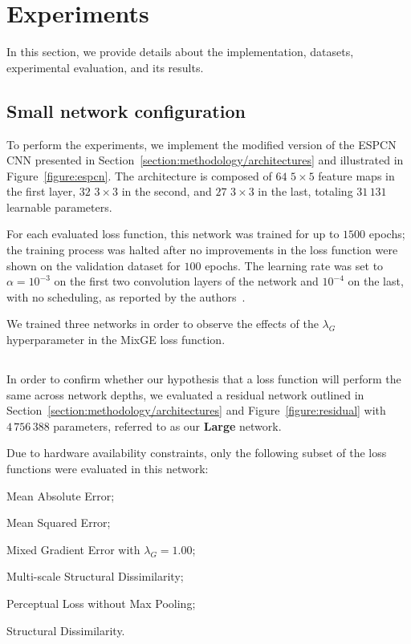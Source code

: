 \section{Experiments}



In this section, we provide details about the implementation, datasets, experimental evaluation, and its results.

\subsection{Small network configuration}

To perform the experiments, we implement the modified version of the ESPCN CNN presented in Section~\ref{section:methodology/architectures} and illustrated in Figure~\ref{figure:espcn}. The architecture is composed of {$64$ $5\times 5$} feature maps in the first layer, {$32$ $3\times 3$} in the second, and $27$ $3\times 3$ in the last, totaling $31\,131$ learnable parameters.

For each evaluated loss function, this network was trained for up to $1500$ epochs; the training process was halted after no improvements in the loss function were shown on the validation dataset for $100$ epochs. The learning rate was set to ${\alpha = 10^{-3}}$ on the first two convolution layers of the network and $10^{-4}$ on the last, with no scheduling, as reported by the authors~\cite{shi2016realtime}.

We trained three networks in order to observe the effects of the $\lambda_{G}$ hyperparameter in the MixGE loss function.

\subsection{}

In order to confirm whether our hypothesis that a loss function will perform the same across network depths, we evaluated a residual network outlined in Section~\ref{section:methodology/architectures} and Figure~\ref{figure:residual} with $4\,756\,388$ parameters, referred to as our \textbf{Large} network.

Due to hardware availability constraints, only the following subset of the loss functions were evaluated in this network:
\begin{enumerate*}
    \item Mean Absolute Error;
    \item Mean Squared Error;
    \item Mixed Gradient Error with $\lambda_G = 1.00$;
    \item Multi-scale Structural Dissimilarity;
    \item Perceptual Loss without Max Pooling;
    \item Structural Dissimilarity.
\end{enumerate*}

